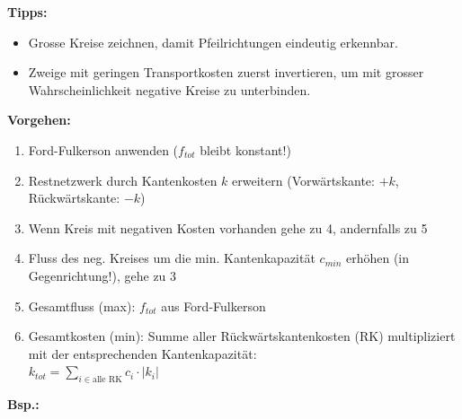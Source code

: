 \textbf{Tipps:}
\begin{itemize}
\item Grosse Kreise zeichnen, damit Pfeilrichtungen eindeutig erkennbar.
\item Zweige mit geringen Transportkosten zuerst invertieren, um mit grosser Wahrscheinlichkeit negative Kreise zu unterbinden.
\end{itemize} 

\textbf{Vorgehen:}
\begin{enumerate}
	\item Ford-Fulkerson anwenden ($f_{tot}$ bleibt konstant!)
	\item Restnetzwerk durch Kantenkosten $k$ erweitern (Vorwärtskante: $+k$, Rückwärtskante: $-k$)
	\item Wenn Kreis mit negativen Kosten vorhanden gehe zu 4, andernfalls zu 5
	\item Fluss des neg. Kreises um die min. Kantenkapazität $c_{min}$ erhöhen (in Gegenrichtung!), gehe zu 3
	\item Gesamtfluss (max): $f_{tot}$ aus Ford-Fulkerson
	\item Gesamtkosten (min): Summe aller Rückwärtskantenkosten (RK) multipliziert mit der entsprechenden Kantenkapazität:\\  
	$k_{tot} = \sum\limits_{ i \in \text{alle RK}} c_i \cdot |k_i| $
\end{enumerate}

\textbf{Bsp.:}

